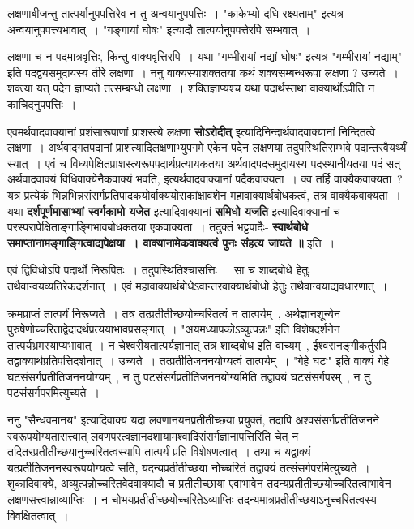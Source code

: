 	लक्षणाबीजन्तु तात्पर्यानुपपत्तिरेव न तु अन्वयानुपपत्तिः~। "काकेभ्यो दधि रक्ष्यताम्" इत्यत्र अन्वयानुपपत्त्यभावात्~। "गङ्गायां घोषः" इत्यादौ तात्पर्यानुपपत्तेरपि सम्भवात्~।\par
	लक्षणा च न पदमात्रवृत्तिः, किन्तु वाक्यवृत्तिरपि~। यथा "गम्भीरायां नद्यां घोषः" इत्यत्र "गम्भीरायां नद्याम्" इति पदद्वयसमुदायस्य तीरे लक्षणा~। ननु वाक्यस्याशक्ततया कथं शक्यसम्बन्धरूपा लक्षणा ? उच्यते~। शक्त्या यत् पदेन ज्ञाप्यते तत्सम्बन्धो लक्षणा~। शक्तिज्ञाप्यश्च यथा पदार्थस्तथा वाक्यार्थोऽपीति न काचिदनुपपत्तिः~।\par
	एवमर्थवादवाक्यानां प्रशंसारूपाणां प्राशस्त्ये लक्षणा {\bfseries सोऽरोदीत्} इत्यादिनिन्दार्थवादवाक्यानां निन्दितत्वे लक्षणा~। अर्थवादगतपदानां प्राशत्यादिलक्षणाभ्युपगमे एकेन पदेन लक्षणया तदुपस्थितिसम्भवे पदान्तरवैयर्थ्यं स्यात्~। एवं च विध्यपेक्षितप्राशस्त्यरूपपदार्थप्रत्यायकतया अर्थवादपदसमुदायस्य पदस्थानीयतया पदं सत् अर्थवादवाक्यं विधिवाक्येनैकवाक्यं भवति, इत्यर्थवादवाक्यानां पदैकवाक्यता~। क्व तर्हि वाक्यैकवाक्यता~? यत्र प्रत्येकं भिन्नभिन्नसंसर्गप्रतिपादकयोर्वाक्ययोराकांक्षावशेन महावाक्यार्थबोधकत्वं, तत्र वाक्यैकवाक्यता~। यथा {\bfseries दर्शपूर्णमासाभ्यां स्वर्गकामो यजेत} इत्यादिवाक्यानां {\bfseries समिधो यजति} इत्यादिवाक्यानां च परस्परापेक्षिताङ्गाङ्गिभावबोधकतया एकवाक्यता~। तदुक्तं भट्टपादैः- {\bfseries स्वार्थबोधे समाप्तानामङ्गाङ्गित्वाद्यपेक्षया~। वाक्यानामेकवाक्यत्वं पुनः संहत्य जायते ॥} इति~।\par 
	एवं द्विविधोऽपि पदार्थो निरूपितः~। तदुपस्थितिश्चासत्तिः~। सा च शाब्दबोधे हेतुः तथैवान्वयव्यतिरेकदर्शनात्~। एवं महावाक्यार्थबोधेऽवान्तरवाक्यार्थबोधो हेतुः तथैवान्वयाद्यवधारणात्~।\par
	क्रमप्राप्तं तात्पर्यं निरूप्यते~। तत्र तत्प्रतीतीच्छयोच्चरितत्वं न तात्पर्यम्~, अर्थज्ञानशून्येन पुरुषेणोच्चरिताद्वेदादर्थप्रत्ययाभावप्रसङ्गात्~। "अयमध्यापकोऽव्युत्पन्नः" इति विशेषदर्शनेन तात्पर्यभ्रमस्याप्यभावात्~। न चेश्वरीयतात्पर्यज्ञानात् तत्र शाब्दबोध इति वाच्यम्~, ईश्वरानङ्गीकर्तुरपि तद्वाक्यार्थप्रतिपत्तिदर्शनात्~। उच्यते~। तत्प्रतीतिजननयोग्यत्वं तात्पर्यम्~। "गेहे घटः" इति वाक्यं गेहे घटसंसर्गप्रतीतिजननयोग्यम्~, न तु पटसंसर्गप्रतीतिजननयोग्यमिति तद्वाक्यं घटसंसर्गपरम्~, न तु पटसंसर्गपरमित्युच्यते~।\par
	ननु "सैन्धवमानय" इत्यादिवाक्यं यदा लवणानयनप्रतीतीच्छया प्रयुक्तं, तदापि अश्वसंसर्गप्रतीतिजनने स्वरूपयोग्यतासत्त्वात् लवणपरत्वज्ञानदशायामश्वादिसंसर्गज्ञानापत्तिरिति चेत् न~। तदितरप्रतीतीच्छयानुच्चरितत्वस्यापि तात्पर्यं प्रति विशेषणत्वात्~। तथा च यद्वाक्यं यत्प्रतीतिजननस्वरूपयोग्यत्वे सति, यदन्यप्रतीतीच्छया नोच्चरितं तद्वाक्यं तत्संसर्गपरमित्युच्यते~। शुकादिवाक्ये, अव्युत्पन्नोच्चरितवेदवाक्यादौ च प्रतीतीच्छाया एवाभावेन तदन्यप्रतीतीच्छयोच्चरितत्वाभावेन लक्षणसत्त्वान्नाव्याप्तिः~। न चोभयप्रतीतीच्छयोच्चरितेऽव्याप्तिः तदन्यमात्रप्रतीतीच्छयाऽनुच्चरितत्वस्य विवक्षितत्वात्~।\par
